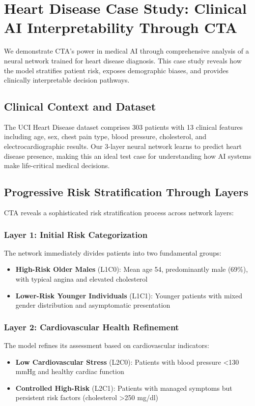 \section{Heart Disease Case Study: Clinical AI Interpretability Through CTA}
\label{sec:heart_case_study}

We demonstrate CTA's power in medical AI through comprehensive analysis of a neural network trained for heart disease diagnosis. This case study reveals how the model stratifies patient risk, exposes demographic biases, and provides clinically interpretable decision pathways.

\subsection{Clinical Context and Dataset}

The UCI Heart Disease dataset comprises 303 patients with 13 clinical features including age, sex, chest pain type, blood pressure, cholesterol, and electrocardiographic results. Our 3-layer neural network learns to predict heart disease presence, making this an ideal test case for understanding how AI systems make life-critical medical decisions.

\subsection{Progressive Risk Stratification Through Layers}

CTA reveals a sophisticated risk stratification process across network layers:

\subsubsection{Layer 1: Initial Risk Categorization}
The network immediately divides patients into two fundamental groups:
\begin{itemize}
    \item \textbf{High-Risk Older Males} (L1C0): Mean age 54, predominantly male (69\%), with typical angina and elevated cholesterol
    \item \textbf{Lower-Risk Younger Individuals} (L1C1): Younger patients with mixed gender distribution and asymptomatic presentation
\end{itemize}

\subsubsection{Layer 2: Cardiovascular Health Refinement}
The model refines its assessment based on cardiovascular indicators:
\begin{itemize}
    \item \textbf{Low Cardiovascular Stress} (L2C0): Patients with blood pressure <130 mmHg and healthy cardiac function
    \item \textbf{Controlled High-Risk} (L2C1): Patients with managed symptoms but persistent risk factors (cholesterol >250 mg/dl)
\end{itemize}

